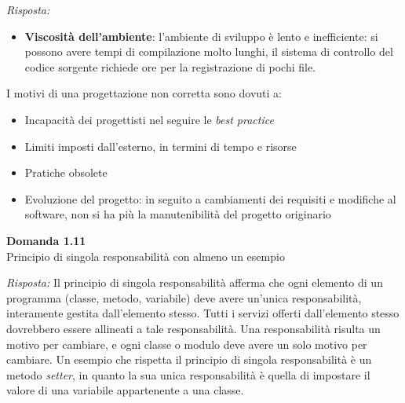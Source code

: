 \documentclass{article}
\newenvironment{problem}[2][Domanda]
    { \begin{mdframed}[backgroundcolor=gray!20] \textbf{#1 #2} \\}
    {  \end{mdframed}}
\newenvironment{solution}
    {\textit{Risposta:}}
    {}
\begin{document}
\begin{solution}
\begin{enumerate}
\begin{itemize}
		\item \textbf{Viscosità dell'ambiente}: l'ambiente di sviluppo è lento e inefficiente: si possono avere tempi di compilazione molto lunghi, il sistema di controllo del codice sorgente richiede ore per la registrazione di pochi file.
	\end{itemize}
\end{enumerate}
I motivi di una progettazione non corretta sono dovuti a:
\begin{itemize}
	\item Incapacità dei progettisti nel seguire le \textit{best practice}
	\item Limiti imposti dall'esterno, in termini di tempo e risorse
	\item Pratiche obsolete
	\item Evoluzione del progetto: in seguito a cambiamenti dei requisiti e modifiche al software, non si ha più la manutenibilità del progetto originario
\end{itemize}
\end{solution}


\begin{problem}{1.11}
Principio di singola responsabilità con almeno un esempio
\end{problem}
\begin{solution}
Il principio di singola responsabilità afferma che ogni elemento di un programma (classe, metodo, variabile) deve avere un'unica responsabilità, interamente gestita dall'elemento stesso.
Tutti i servizi offerti dall'elemento stesso dovrebbero essere allineati a tale responsabilità.
\newline
Una responsabilità risulta un motivo per cambiare, e ogni classe o modulo deve avere un solo motivo per cambiare.
\newline
Un esempio che rispetta il principio di singola responsabilità è un metodo \textit{setter}, in quanto la sua unica responsabilità è quella di impostare il valore di una variabile appartenente a una classe.
\end{solution}
\end{document}
